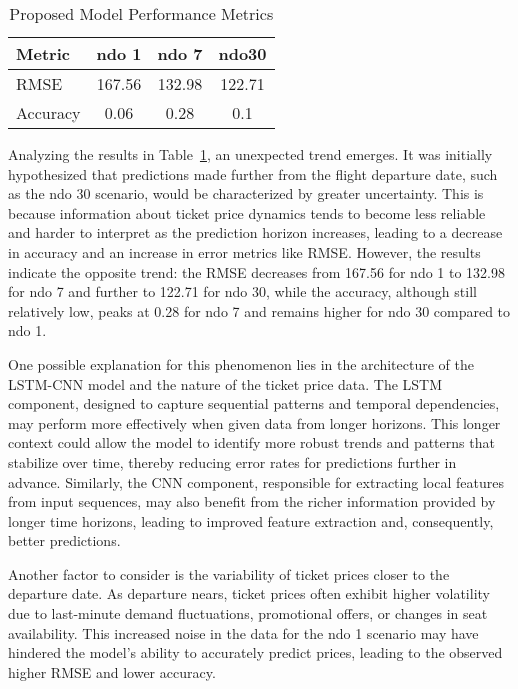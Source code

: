 \documentclass[conference]{IEEEtran}
\begin{document}
\begin{table}[htbp]
    \centering
    \caption{Proposed Model Performance Metrics}
    \label{tab:results}
    \begin{tabular}{lccc}
        \toprule
        Metric & ndo 1 & ndo 7 & ndo30 \\
        \midrule
        RMSE & 167.56 & 132.98 & 122.71 \\ %
        Accuracy & 0.06 & 0.28 & 0.1 \\ %
        \bottomrule
    \end{tabular}
\end{table}

Analyzing the results in Table~\ref{tab:results}, an unexpected trend emerges. It was initially hypothesized that predictions made further from the flight departure date, such as the ndo 30 scenario, would be characterized by greater uncertainty. This is because information about ticket price dynamics tends to become less reliable and harder to interpret as the prediction horizon increases, leading to a decrease in accuracy and an increase in error metrics like RMSE. However, the results indicate the opposite trend: the RMSE decreases from 167.56 for ndo 1 to 132.98 for ndo 7 and further to 122.71 for ndo 30, while the accuracy, although still relatively low, peaks at 0.28 for ndo 7 and remains higher for ndo 30 compared to ndo 1.

One possible explanation for this phenomenon lies in the architecture of the LSTM-CNN model and the nature of the ticket price data. The LSTM component, designed to capture sequential patterns and temporal dependencies, may perform more effectively when given data from longer horizons. This longer context could allow the model to identify more robust trends and patterns that stabilize over time, thereby reducing error rates for predictions further in advance. Similarly, the CNN component, responsible for extracting local features from input sequences, may also benefit from the richer information provided by longer time horizons, leading to improved feature extraction and, consequently, better predictions.

Another factor to consider is the variability of ticket prices closer to the departure date. As departure nears, ticket prices often exhibit higher volatility due to last-minute demand fluctuations, promotional offers, or changes in seat availability. This increased noise in the data for the ndo 1 scenario may have hindered the model's ability to accurately predict prices, leading to the observed higher RMSE and lower accuracy.
\end{document}
